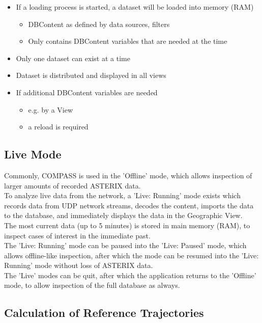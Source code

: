 \begin{itemize}
\item If a loading process is started, a dataset will be loaded into memory (RAM)
\begin{itemize}
\item DBContent as defined by data sources, filters
\item Only contains DBContent variables that are needed at the time
\end{itemize}
\item Only one dataset can exist at a time
\item Dataset is distributed and displayed in all views
\item If additional DBContent variables are needed
\begin{itemize}
\item e.g. by a View
\item a reload is required
\end{itemize}
\end{itemize}

\subsection*{Live Mode}
Commonly, COMPASS is used in the 'Offline' mode, which allows inspection of larger amounts of recorded ASTERIX data. \\

To analyze live data from the network, a 'Live: Running' mode exists which records data from UDP network streams, decodes the content, imports the data to the database, and immediately displays the data in the Geographic View. \\

The most current data (up to 5 minutes) is stored in main memory (RAM), to inspect cases of interest in the immediate past. \\

The 'Live: Running' mode can be paused into the 'Live: Paused' mode, which allows offline-like inspection, after which the mode can be resumed into the 'Live: Running' mode without loss of ASTERIX data. \\

The 'Live' modes can be quit, after which the application returns to the 'Offline' mode, to allow inspection of the full database as always.

\subsection*{Calculation of Reference Trajectories}

